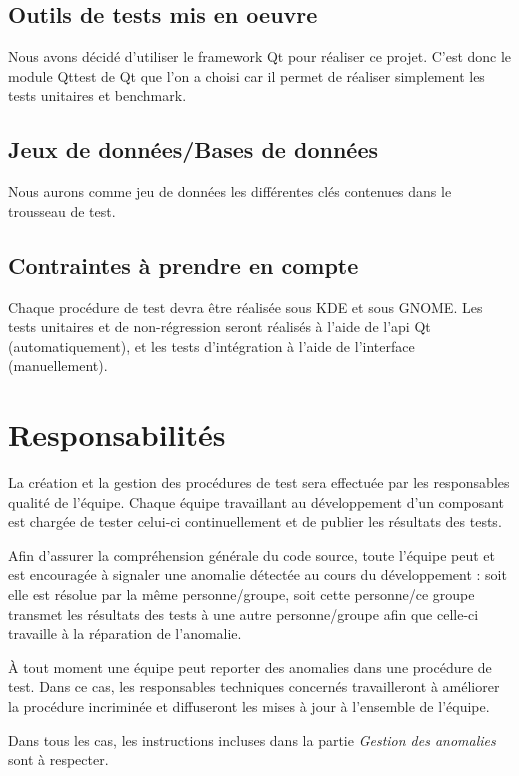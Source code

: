 \documentclass{../res/univ-projet}
\begin{document}
\subsection{Outils de tests mis en oeuvre}
Nous avons décidé d'utiliser le framework Qt pour réaliser ce projet. C'est donc le module Qttest de Qt que l'on a choisi car il permet de réaliser simplement les tests unitaires et benchmark.

\subsection{Jeux de données/Bases de données}
Nous aurons comme jeu de données les différentes clés contenues dans le trousseau de test.


\subsection{Contraintes à prendre en compte}
Chaque procédure de test devra être réalisée sous KDE et sous GNOME.
Les tests unitaires et de non-régression seront réalisés à l'aide de l'api Qt (automatiquement), et les tests d'intégration à l'aide de l'interface (manuellement).



\section{Responsabilités}

  La création et la gestion des procédures de test sera effectuée par les responsables qualité de l'équipe. Chaque équipe travaillant au développement d'un composant est chargée de tester celui-ci continuellement et de publier les résultats des tests.
  
  Afin d'assurer la compréhension générale du code source, toute l'équipe peut et est encouragée à signaler une anomalie détectée au cours du développement : soit elle est résolue par la même personne/groupe, soit cette personne/ce groupe transmet les résultats 
  des tests à une autre personne/groupe afin que celle-ci travaille à la réparation de l'anomalie.
  
  À tout moment une équipe peut reporter des anomalies dans une procédure de test. Dans ce cas, les responsables techniques concernés travailleront à améliorer la procédure incriminée et diffuseront les mises à jour à l'ensemble de l'équipe.

  Dans tous les cas, les instructions incluses dans la partie \emph{Gestion des anomalies} sont à respecter.
\end{document}
